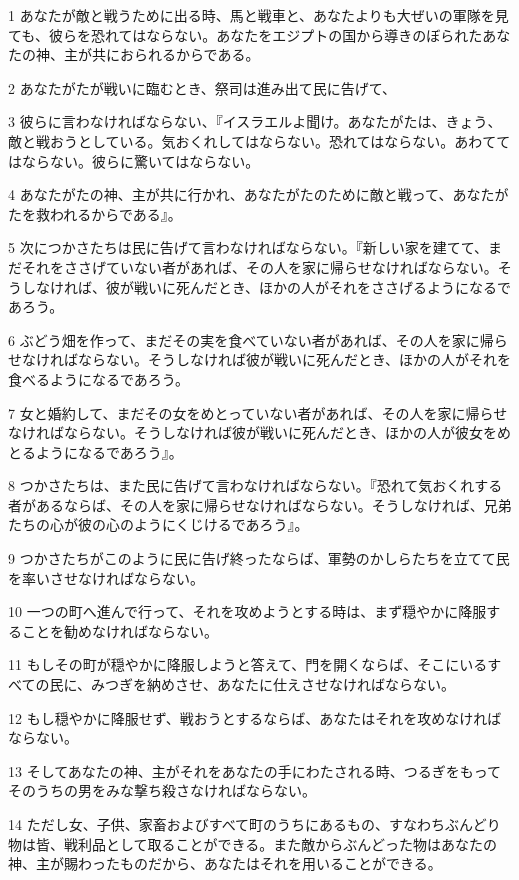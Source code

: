 \par 1 あなたが敵と戦うために出る時、馬と戦車と、あなたよりも大ぜいの軍隊を見ても、彼らを恐れてはならない。あなたをエジプトの国から導きのぼられたあなたの神、主が共におられるからである。
\par 2 あなたがたが戦いに臨むとき、祭司は進み出て民に告げて、
\par 3 彼らに言わなければならない、『イスラエルよ聞け。あなたがたは、きょう、敵と戦おうとしている。気おくれしてはならない。恐れてはならない。あわててはならない。彼らに驚いてはならない。
\par 4 あなたがたの神、主が共に行かれ、あなたがたのために敵と戦って、あなたがたを救われるからである』。
\par 5 次につかさたちは民に告げて言わなければならない。『新しい家を建てて、まだそれをささげていない者があれば、その人を家に帰らせなければならない。そうしなければ、彼が戦いに死んだとき、ほかの人がそれをささげるようになるであろう。
\par 6 ぶどう畑を作って、まだその実を食べていない者があれば、その人を家に帰らせなければならない。そうしなければ彼が戦いに死んだとき、ほかの人がそれを食べるようになるであろう。
\par 7 女と婚約して、まだその女をめとっていない者があれば、その人を家に帰らせなければならない。そうしなければ彼が戦いに死んだとき、ほかの人が彼女をめとるようになるであろう』。
\par 8 つかさたちは、また民に告げて言わなければならない。『恐れて気おくれする者があるならば、その人を家に帰らせなければならない。そうしなければ、兄弟たちの心が彼の心のようにくじけるであろう』。
\par 9 つかさたちがこのように民に告げ終ったならば、軍勢のかしらたちを立てて民を率いさせなければならない。
\par 10 一つの町へ進んで行って、それを攻めようとする時は、まず穏やかに降服することを勧めなければならない。
\par 11 もしその町が穏やかに降服しようと答えて、門を開くならば、そこにいるすべての民に、みつぎを納めさせ、あなたに仕えさせなければならない。
\par 12 もし穏やかに降服せず、戦おうとするならば、あなたはそれを攻めなければならない。
\par 13 そしてあなたの神、主がそれをあなたの手にわたされる時、つるぎをもってそのうちの男をみな撃ち殺さなければならない。
\par 14 ただし女、子供、家畜およびすべて町のうちにあるもの、すなわちぶんどり物は皆、戦利品として取ることができる。また敵からぶんどった物はあなたの神、主が賜わったものだから、あなたはそれを用いることができる。
